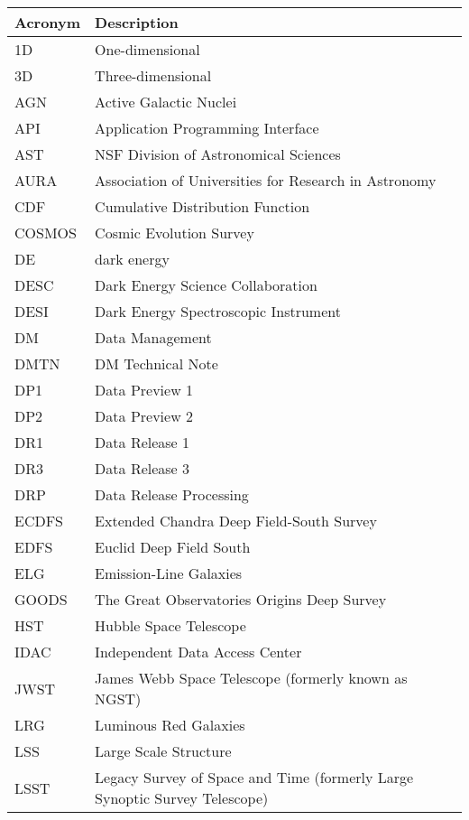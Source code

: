 \addtocounter{table}{-1}
\begin{longtable}{p{}p{}}\hline
\textbf{Acronym} & \textbf{Description}  \\\hline

1D & One-dimensional \\\hline
3D & Three-dimensional \\\hline
AGN & Active Galactic Nuclei \\\hline
API & Application Programming Interface \\\hline
AST & NSF Division of Astronomical Sciences \\\hline
AURA & Association of Universities for Research in Astronomy \\\hline
CDF & Cumulative Distribution Function \\\hline
COSMOS & Cosmic Evolution Survey \\\hline
DE & dark energy \\\hline
DESC & Dark Energy Science Collaboration \\\hline
DESI & Dark Energy Spectroscopic Instrument \\\hline
DM & Data Management \\\hline
DMTN & DM Technical Note \\\hline
DP1 & Data Preview 1 \\\hline
DP2 & Data Preview 2 \\\hline
DR1 & Data Release 1 \\\hline
DR3 & Data Release 3 \\\hline
DRP & Data Release Processing \\\hline
ECDFS & Extended Chandra Deep Field-South Survey \\\hline
EDFS & Euclid Deep Field South \\\hline
ELG & Emission-Line Galaxies \\\hline
GOODS & The Great Observatories Origins Deep Survey \\\hline
HST & Hubble Space Telescope \\\hline
IDAC & Independent Data Access Center \\\hline
JWST & James Webb Space Telescope (formerly known as NGST) \\\hline
LRG & Luminous Red Galaxies \\\hline
LSS & Large Scale Structure \\\hline
LSST & Legacy Survey of Space and Time (formerly Large Synoptic Survey Telescope) \\\hline

\end{longtable}
